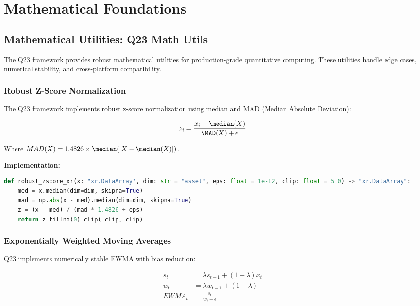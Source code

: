 \documentclass[11pt,letterpaper]{book}
\begin{document}
\chapter{Mathematical Foundations}

\section{Mathematical Utilities: Q23 Math Utils}

The Q23 framework provides robust mathematical utilities for production-grade quantitative computing. These utilities handle edge cases, numerical stability, and cross-platform compatibility.

\subsection{Robust Z-Score Normalization}

The Q23 framework implements robust z-score normalization using median and MAD (Median Absolute Deviation):

\begin{equation}
z_i = \frac{x_i - \median(X)}{\MAD(X) + \epsilon}
\end{equation}

Where $MAD(X) = 1.4826 \times \median(|X - \median(X)|)$.

\textbf{Implementation:}
\begin{lstlisting}[language=Python,caption=Q23 Robust Z-Score]
def robust_zscore_xr(x: "xr.DataArray", dim: str = "asset", eps: float = 1e-12, clip: float = 5.0) -> "xr.DataArray":
    med = x.median(dim=dim, skipna=True)
    mad = np.abs(x - med).median(dim=dim, skipna=True)
    z = (x - med) / (mad * 1.4826 + eps)
    return z.fillna(0).clip(-clip, clip)
\end{lstlisting}

\subsection{Exponentially Weighted Moving Averages}

Q23 implements numerically stable EWMA with bias reduction:

\begin{align}
s_t &= \lambda s_{t-1} + (1-\lambda) x_t \\
w_t &= \lambda w_{t-1} + (1-\lambda) \\
EWMA_t &= \frac{s_t}{w_t + \epsilon}
\end{align}
\end{document}
